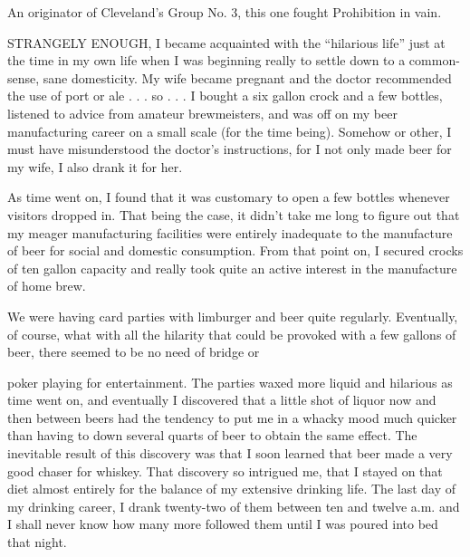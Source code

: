 
\bbChapterPreamble


\begin{biblechapter}
    An originator of Cleveland’s Group No. 3, 
    this one fought Prohibition in vain.
\end{biblechapter}


\begin{biblechapter}
    STRANGELY ENOUGH, 
    I became acquainted with the “hilarious life” 
    just at the time in my own life 
    when I was beginning really to settle down to a common-sense, 
    sane domesticity.
\verse My wife became pregnant 
    and the doctor recommended the use of port or ale 
    . . . so . . . I bought a six gallon crock and a few bottles, 
    listened to advice from amateur brewmeisters, 
    and was off on my beer manufacturing career on a small scale 
    (for the time being).
\verse Somehow or other, 
    I must have misunderstood the doctor’s instructions, 
    for I not only made beer for my wife, 
    I also drank it for her.

\verse As time went on, I found that it was customary to open a few bottles whenever visitors dropped in. That being the case, it didn’t take me long to figure out that my meager manufacturing facilities were entirely inadequate to the manufacture of beer for social and domestic consumption. From that point on, I secured crocks of ten gallon capacity and really took quite an active interest in the manufacture of home brew.

We were having card parties with limburger and beer quite regularly. Eventually, of course, what with all the hilarity that could be provoked with a few gallons of beer, there seemed to be no need of bridge or

poker playing for entertainment. The parties waxed more liquid and hilarious as time went on, and eventually I discovered that a little shot of liquor now and then between beers had the tendency to put me in a whacky mood much quicker than having to down several quarts of beer to obtain the same effect. The inevitable result of this discovery was that I soon learned that beer made a very good chaser for whiskey. That discovery so intrigued me, that I stayed on that diet almost entirely for the balance of my extensive drinking life. The last day of my drinking career, I drank twenty-two of them between ten and twelve a.m. and I shall never know how many more followed them until I was poured into bed that night.


\end{biblechapter}
